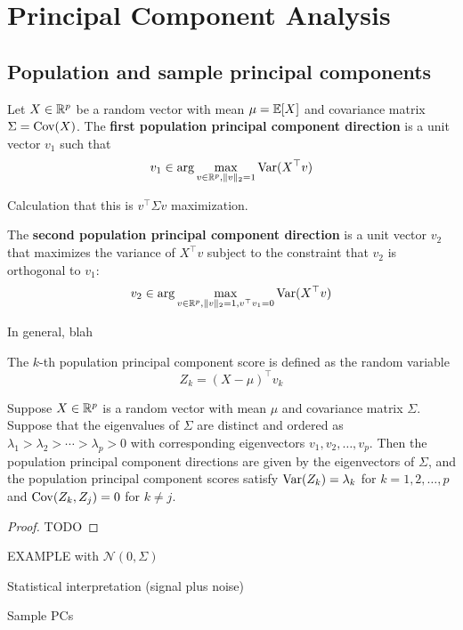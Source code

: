 
\section{Principal Component Analysis}
\label{sec:pca}


\subsection{Population and sample principal components}

\begin{definition}
    Let $X \in \mathbb{R}^p$ be a random vector with mean $\mu = \mathbb{E}[X]$ and covariance matrix $\Sigma = \operatorname{Cov}(X)$. 
    The \textbf{first population principal component direction} is a unit vector $v_1$ such that 
    \begin{equation}
        v_1 \in \arg \max_{v \in \mathbb{R}^p, \|v\|_2 = 1} \operatorname{Var}(X^{\top} v) 
    \end{equation}

    Calculation that this is $v^{\top} \Sigma v$ maximization. 

    The \textbf{second population principal component direction} is a unit vector $v_2$ that maximizes the 
    variance of $X^{\top} v$ subject to the constraint that $v_2$ is orthogonal to $v_1$: 
    \begin{equation}
        v_2 \in \arg \max_{v \in \mathbb{R}^p, \|v\|_2 = 1, v^{\top} v_1 = 0} \operatorname{Var}(X^{\top} v)
    \end{equation}

    In general, blah 

    The $k$-th population principal component score is defined as the random variable
    \begin{equation}
        Z_k = (X - \mu)^{\top} v_k
    \end{equation}

    \begin{proposition}
        Suppose $X \in \mathbb{R}^p$ is a random vector with mean $\mu$ and covariance matrix $\Sigma$.
        Suppose that the eigenvalues of $\Sigma$ are distinct and ordered as 
        $\lambda_1 > \lambda_2 > \cdots > \lambda_p > 0$ with corresponding eigenvectors $v_1, v_2, \ldots, v_p$. 
        Then the population principal component directions are given by the eigenvectors of $\Sigma$, and the population
        principal component scores satisfy $\operatorname{Var}(Z_k) = \lambda_k$ for $k = 1, 2, \ldots, p$ and $\operatorname{Cov}(Z_k, Z_j) = 0$ for $k \neq j$.
    \end{proposition}
    \begin{proof}
        TODO
    \end{proof}

    EXAMPLE with $\mathcal{N}(0, \Sigma)$ 

    Statistical interpretation (signal plus noise)

    Sample PCs
\end{definition}




